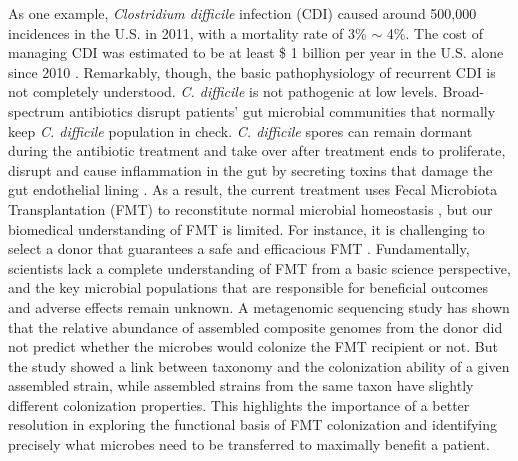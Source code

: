 As one example, \textit{Clostridium difficile} infection (CDI) caused around 500,000 incidences in the U.S. in 2011, with a mortality rate of 3\% $\sim$ 4\%. The cost of managing CDI was estimated to be at least \$ 1 billion per year in the U.S. alone since 2010 \cite{Ghantoji:2010ku,Lessa:2015it}. Remarkably, though, the basic pathophysiology of recurrent CDI is not completely understood. \textit{C. difficile} is not pathogenic at low levels. Broad-spectrum antibiotics disrupt patients' gut microbial communities that normally keep \textit{C. difficile} population in check. \textit{C. difficile} spores can remain dormant during the antibiotic treatment and take over after treatment ends to proliferate, disrupt and cause inflammation in the gut by secreting toxins that damage the gut endothelial lining \cite{Bakken:2011fs}. As a result, the current treatment uses Fecal Microbiota Transplantation (FMT) to reconstitute normal microbial homeostasis \cite{Kassam:2013dv}, but our biomedical understanding of FMT is limited. For instance, it is challenging to select a donor that guarantees a safe and efficacious FMT \cite{Ratner:2016dm}. Fundamentally, scientists lack a complete understanding of FMT from a basic science perspective, and the key microbial populations that are responsible for beneficial outcomes and adverse effects remain unknown. A metagenomic sequencing study \cite{Lee:2017jw} has shown that the relative abundance of assembled composite genomes from the donor did not predict whether the microbes would colonize the FMT recipient or not. But the study showed a link between taxonomy and the colonization ability of a given assembled strain, while assembled strains from the same taxon have slightly different colonization properties. This highlights the importance of a better resolution in exploring the functional basis of FMT colonization and identifying precisely what microbes need to be transferred to maximally benefit a patient. 

